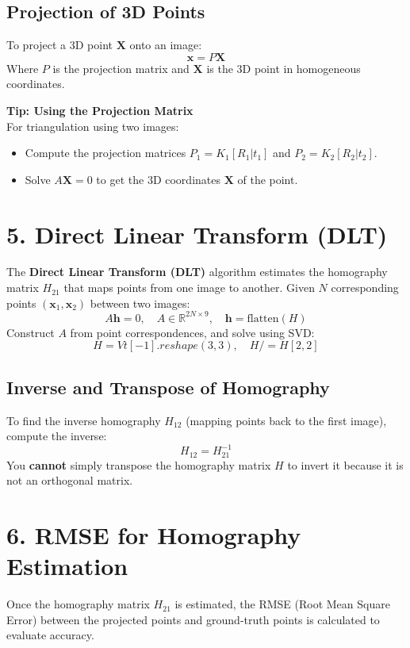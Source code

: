 \documentclass[a4paper,10pt]{article}
\begin{document}
\subsection*{Projection of 3D Points}
To project a 3D point $\mathbf{X}$ onto an image:
\[
\mathbf{x} = P \mathbf{X}
\]
Where $P$ is the projection matrix and $\mathbf{X}$ is the 3D point in homogeneous coordinates.

\textbf{Tip: Using the Projection Matrix} \\
For triangulation using two images:
\begin{itemize}
    \item Compute the projection matrices $P_1 = K_1 [R_1 | t_1]$ and $P_2 = K_2 [R_2 | t_2]$.
    \item Solve $A \mathbf{X} = 0$ to get the 3D coordinates $\mathbf{X}$ of the point.
\end{itemize}

\section*{5. Direct Linear Transform (DLT)}

The \textbf{Direct Linear Transform (DLT)} algorithm estimates the homography matrix $H_{21}$ that maps points from one image to another. Given $N$ corresponding points $(\mathbf{x}_1, \mathbf{x}_2)$ between two images:
\[
A \mathbf{h} = 0, \quad A \in \mathbb{R}^{2N \times 9}, \quad \mathbf{h} = \text{flatten}(H)
\]
Construct $A$ from point correspondences, and solve using SVD:
\[
H = Vt[-1].reshape(3, 3), \quad H /= H[2, 2]
\]

\subsection*{Inverse and Transpose of Homography}
To find the inverse homography $H_{12}$ (mapping points back to the first image), compute the inverse:
\[
H_{12} = H_{21}^{-1}
\]
You \textbf{cannot} simply transpose the homography matrix $H$ to invert it because it is not an orthogonal matrix.

\section*{6. RMSE for Homography Estimation}

Once the homography matrix $H_{21}$ is estimated, the RMSE (Root Mean Square Error) between the projected points and ground-truth points is calculated to evaluate accuracy.
\end{document}
